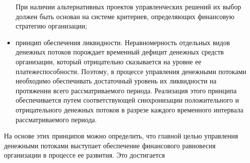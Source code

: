 \begin{itemize}
	При наличии альтернативных проектов управленческих решений их выбор должен быть основан на системе критериев, определяющих финансовую стратегию организации;
	\item принцип обеспечения ликвидности.
	Неравномерность отдельных видов денежных потоков порождает временный дефицит денежных средств организации, который отрицательно сказывается на уровне ее платежеспособности.
	Поэтому, в процессе управления денежными потоками необходимо обеспечивать достаточный уровень их ликвидности на протяжении всего рассматриваемого периода.
	Реализация этого принципа обеспечивается путем соответствующей синхронизации положительного и отрицательного денежных потоков в разрезе каждого временного интервала рассматриваемого периода.
\end{itemize}

На основе этих принципов можно определить, что главной целью управления денежными потоками выступает обеспечение финансового равновесия организации в процессе ее развития.
Это достигается 